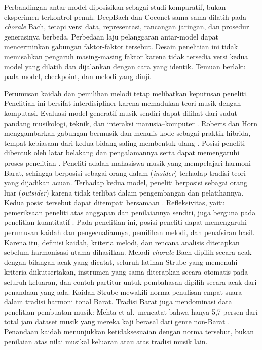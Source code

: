 Perbandingan antar-model diposisikan sebagai studi komparatif, bukan eksperimen terkontrol penuh. DeepBach dan Coconet sama-sama dilatih pada \textit{chorale} Bach, tetapi versi data, representasi, rancangan jaringan, dan prosedur generasinya berbeda. Perbedaan laju pelanggaran antar-model dapat mencerminkan gabungan faktor-faktor tersebut. Desain penelitian ini tidak memisahkan pengaruh masing-masing faktor karena tidak tersedia versi kedua model yang dilatih dan dijalankan dengan cara yang identik. Temuan berlaku pada model, checkpoint, dan melodi yang diuji.

Perumusan kaidah dan pemilihan melodi tetap melibatkan keputusan peneliti. Penelitian ini bersifat interdisipliner karena memadukan teori musik dengan komputasi. Evaluasi model generatif musik sendiri dapat dilihat dari sudut pandang musikologi, teknik, dan interaksi manusia--komputer \parencite{lerch2025}. Roberts dan Horn menggambarkan gabungan bermusik dan menulis kode sebagai praktik hibrida, tempat kebiasaan dari kedua bidang saling membentuk ulang \parencite{roberts2025}. Posisi peneliti dibentuk oleh latar belakang dan pengalamannya serta dapat memengaruhi proses penelitian \parencite{holmes2020}. Peneliti adalah mahasiswa musik yang mempelajari harmoni Barat, sehingga berposisi sebagai orang dalam (\textit{insider}) terhadap tradisi teori yang dijadikan acuan. Terhadap kedua model, peneliti berposisi sebagai orang luar (\textit{outsider}) karena tidak terlibat dalam pengembangan dan pelatihannya. Kedua posisi tersebut dapat ditempati bersamaan \parencite{dwyer2009}. Refleksivitas, yaitu pemeriksaan peneliti atas anggapan dan penilaiannya sendiri, juga berguna pada penelitian kuantitatif \parencite{jamieson2023}. Pada penelitian ini, posisi peneliti dapat memengaruhi perumusan kaidah dan pengecualiannya, pemilihan melodi, dan penafsiran hasil. Karena itu, definisi kaidah, kriteria melodi, dan rencana analisis ditetapkan sebelum harmonisasi utama dihasilkan. Melodi \textit{chorale} Bach dipilih secara acak dengan bilangan acak yang dicatat, seluruh latihan Strube yang memenuhi kriteria diikutsertakan, instrumen yang sama diterapkan secara otomatis pada seluruh keluaran, dan contoh partitur untuk pembahasan dipilih secara acak dari penandaan yang ada. Kaidah Strube mewakili norma penulisan empat suara dalam tradisi harmoni tonal Barat. Tradisi Barat juga mendominasi data penelitian pembuatan musik: Mehta et al.\ mencatat bahwa hanya 5,7 persen dari total jam dataset musik yang mereka kaji berasal dari genre non-Barat \parencite{mehta2025}. Penandaan kaidah menunjukkan ketidaksesuaian dengan norma tersebut, bukan penilaian atas nilai musikal keluaran atau atas tradisi musik lain.

